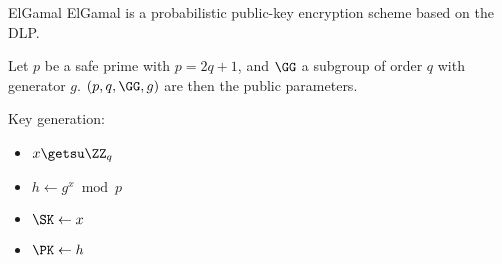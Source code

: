 \iffalse
\begin{frame}{Flavours of secrecy}
  \pause
  Forward secrecy (FS):
  \begin{itemize}[<+(1)->]
    \item Subsequent communications are secure post-corruption
    \item Old \enquote{users} cannot read new data (after leaving)
  \end{itemize}

  \pause
  Backward secrecy (future secrecy):
  \begin{itemize}[<+(1)->]
    \item Past communications are secure post-corruption
    \item New \enquote{users} cannot read prior data (before joining)    
  \end{itemize}

  \pause
  Forward secrecy is sometimes called perfect forward secrecy.
  \begin{itemize}
    \item I like to distinguish between the two
    \item Terminology can get confusing
  \end{itemize} 
\end{frame}

\begin{frame}{Perfect forward secrecy}
  The terminology is confusing.

  \begin{itemize}
  \item \emph{Ephemeral} keys: ephemeral DH
  \item Generate short-term \enquote{session} keys (v.s. long-term \emph{static} keys)
  \end{itemize}

  \pause
  No absolute protection against future cryptanalysis.
\end{frame}
\fi

\begin{frame}{ElGamal}
  ElGamal is a probabilistic public-key encryption scheme based on the DLP.

  \pause
  Let $p$ be a safe prime with $p = 2q + 1$, and $\GG$ a subgroup of order $q$ with generator $g$. 
  $(p, q, \GG, g)$ are then the public parameters.

  \pause
  Key generation:
  \begin{itemize}[<+(1)->]
    \item $x \getsu \ZZ_q$
    \item $h \gets g^x \bmod{p}$
    \item $\SK \gets x$
    \item $\PK \gets h$
  \end{itemize}
\end{frame}

